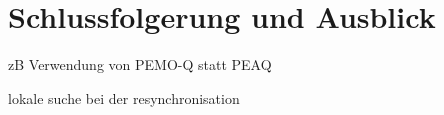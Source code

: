 \chapter{Schlussfolgerung und Ausblick}
\label{ch:ausblick}



zB Verwendung von PEMO-Q\cite{huber2006pemo} statt PEAQ

lokale suche bei der resynchronisation

